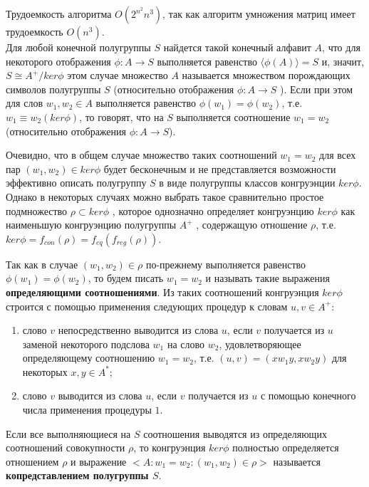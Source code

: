 \documentclass[bachelor, och, labwork]{shiza}
\begin{document}
Трудоемкость алгоритма $O(2^{n^2}n^3)$, так как алгоритм умножения 
матриц имеет трудоемкость $O(n^3)$.\\


Для любой конечной полугруппы $S$ найдется такой конечный алфавит $A$, что для
некоторого отображения $\phi : A \rightarrow S$ выполняется равенство
$\langle \phi(A) \rangle = S$ и, значит, $S \cong A^+/ ker \phi$ этом случае
множество $A$ называется множеством порождающих символов полугруппы $S$
(относительно отображения $\phi : A \rightarrow S$ ). Если при этом для слов
$w_1,w_2 \in A$ выполняется равенство $\phi(w_1) = \phi(w_2)$, т.е. $w_1 \equiv w_2(ker\phi)$, 
то говорят, что на $S$ выполняется соотношение $w_1 = w_2$ (относительно 
отображения $\phi : A \rightarrow S$).

Очевидно, что в общем случае множество таких соотношений $w_1 = w_2$ для всех пар 
$(w_1, w_2) \in ker\phi$ будет бесконечным и не представляется возможности эффективно 
описать полугруппу $S$ в виде полугруппы классов конгруэнции $ker\phi$. Однако в 
некоторых случаях можно выбрать такое сравнительно простое подмножество $\rho \subset ker\phi$ , 
которое однозначно определяет конгруэнцию $ker\phi$ как наименьшую конгруэнцию
полугруппы $A^+$ , содержащую отношение $\rho$, т.е. $ker\phi = f_{con}(\rho) = f_{eq}(f_{reg}(\rho))$.

Так как в случае $(w_1, w_2) \in \rho$ по-прежнему выполняется равенство $\phi(w_1) = \phi(w_2)$, 
то будем писать $w_1 = w_2$ и называть такие выражения \textbf{определяющими соотношениями}. 
Из таких соотношений конгруэнция $ker\phi$ строится с помощью применения следующих процедур к
словам $u,v \in A^+$:


\begin{enumerate}
      \item слово $v$ непосредственно выводится из слова $u$, если $v$
      получается из $u$ заменой некоторого подслова $w_1$ на слово $w_2$,
      удовлетворяющее определяющему соотношению $w_1 = w_2$, т.е. $(u, v) =
      (xw_1y, xw_2y)$ для некоторых $x, y \in A^*$;
      \item слово $v$ выводится из слова $u$, если $v$ получается из $u$ с
      помощью конечного числа применения процедуры $1$.
\end{enumerate}
    
Если все выполняющиеся на $S$ соотношения выводятся из определяющих соотношений 
совокупности $\rho$, то конгруэнция $ker\phi$ полностью определяется отношением 
$\rho$ и выражение $<A: {w_1 = w_2 : (w_1, w_2) \in \rho}>$ называется 
\textbf{копредставлением полугруппы $S$}.
\end{document}
